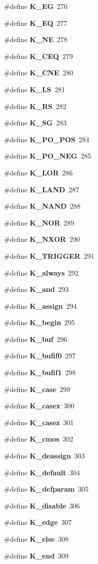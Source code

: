 \begin{CompactItemize}
\#define {\bf K\_\-EG}\ 276
\item 
\#define {\bf K\_\-EQ}\ 277
\item 
\#define {\bf K\_\-NE}\ 278
\item 
\#define {\bf K\_\-CEQ}\ 279
\item 
\#define {\bf K\_\-CNE}\ 280
\item 
\#define {\bf K\_\-LS}\ 281
\item 
\#define {\bf K\_\-RS}\ 282
\item 
\#define {\bf K\_\-SG}\ 283
\item 
\#define {\bf K\_\-PO\_\-POS}\ 284
\item 
\#define {\bf K\_\-PO\_\-NEG}\ 285
\item 
\#define {\bf K\_\-LOR}\ 286
\item 
\#define {\bf K\_\-LAND}\ 287
\item 
\#define {\bf K\_\-NAND}\ 288
\item 
\#define {\bf K\_\-NOR}\ 289
\item 
\#define {\bf K\_\-NXOR}\ 290
\item 
\#define {\bf K\_\-TRIGGER}\ 291
\item 
\#define {\bf K\_\-always}\ 292
\item 
\#define {\bf K\_\-and}\ 293
\item 
\#define {\bf K\_\-assign}\ 294
\item 
\#define {\bf K\_\-begin}\ 295
\item 
\#define {\bf K\_\-buf}\ 296
\item 
\#define {\bf K\_\-bufif0}\ 297
\item 
\#define {\bf K\_\-bufif1}\ 298
\item 
\#define {\bf K\_\-case}\ 299
\item 
\#define {\bf K\_\-casex}\ 300
\item 
\#define {\bf K\_\-casez}\ 301
\item 
\#define {\bf K\_\-cmos}\ 302
\item 
\#define {\bf K\_\-deassign}\ 303
\item 
\#define {\bf K\_\-default}\ 304
\item 
\#define {\bf K\_\-defparam}\ 305
\item 
\#define {\bf K\_\-disable}\ 306
\item 
\#define {\bf K\_\-edge}\ 307
\item 
\#define {\bf K\_\-else}\ 308
\item 
\#define {\bf K\_\-end}\ 309
\item 

\end{CompactItemize}

